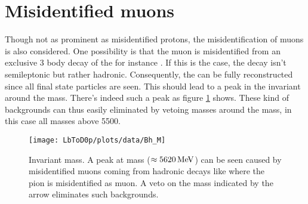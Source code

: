 \section{Misidentified muons}
\label{sec:BKG_misIDmu}
Though not as prominent as misidentified protons, the misidentification of muons is also considered.
One possibility is that the muon is misidentified from an exclusive 3 body decay of the \Lb for instance \decay{\Lb}{\Dz\proton\pim}.
If this is the case, the decay isn't semileptonic but rather hadronic.
Consequently, the \Lb can be fully reconstructed since all final state particles are seen.
This should lead to a peak in the invariant \Dz\proton\mun around the \Lb mass.
There's indeed such a peak as figure \ref{fig:plot_D0pmuMass} shows.
These kind of backgrounds can thus easily eliminated by vetoing \Dz\proton\muon masses around the \Lb mass, in this case all masses above 5500\mev.
\begin{figure}[hptb]
	\centering
	\texttt{[image: LbToD0p/plots/data/Bh\_M]}
	\caption{Invariant \Dz\proton\mun mass. A peak at \Lb mass ($\approx 5620 \mathrm{\,Me\kern -0.1em V}$) can be seen caused by misidentified muons coming from hadronic decays like \decay{\Lb}{\Dz\proton\pi} where the pion is misidentified as muon. 
             A veto on the \Dz\proton\mun mass indicated by the arrow eliminates such backgrounds.}
	\label{fig:plot_D0pmuMass}
\end{figure}

